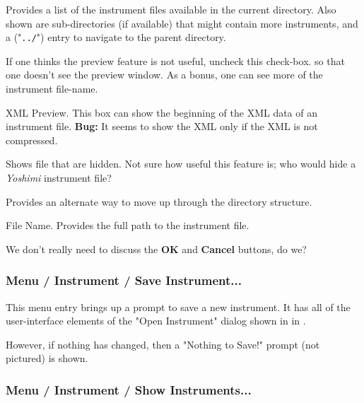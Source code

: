    Provides a list of the instrument files available in the current
   directory.  Also shown are sub-directories (if available)
   that might contain more instruments, and a ("\texttt{../}") entry
   to navigate to the parent directory.

   If one thinks the preview feature is not useful, uncheck this check-box.
   so that one doesn't see the preview window.  As a bonus, one can see more
   of the instrument file-name.

   XML Preview.
   This box can show the beginning of the XML data of an instrument file.
   \textbf{Bug:}
   It seems to show the XML only if the XML is not compressed.

   Shows file that are hidden.  Not sure how useful this feature is;
   who would hide a \textsl{Yoshimi} instrument file?

   Provides an alternate way to move up through the directory structure.

   File Name.
   Provides the full path to the instrument file.

   We don't really need to discuss the \textbf{OK} and \textbf{Cancel}
   buttons, do we?

\subsubsection{Menu / Instrument / Save Instrument...}
\label{subsubsec:menu_instrument_save}

   This menu entry brings up a prompt to save a new instrument.
   It has all of the user-interface elements of the "Open Instrument"
   dialog shown in
   in .

   However, if nothing has changed, then a "Nothing to Save!" prompt (not
   pictured) is shown.

\subsubsection{Menu / Instrument / Show Instruments...}
\label{subsubsec:menu_instrument_show}

